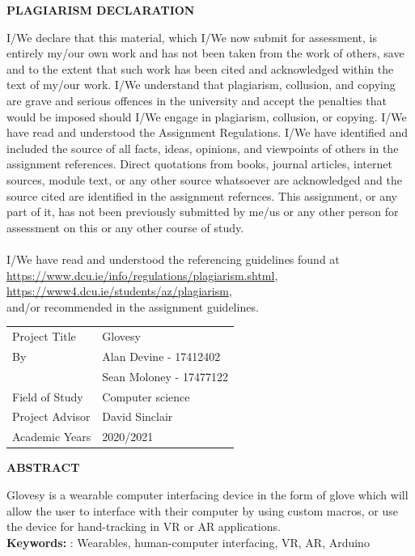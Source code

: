 \documentclass[12pt,a4paper,oneside]{book}
\theoremstyle{plain}
\numberwithin{equation}{chapter}
\begin{document}
\newpage
{}
\begin{center}
    \large\textbf{PLAGIARISM DECLARATION}
\end{center}
\noindent I/We declare that this material, which I/We now submit for assessment, is entirely my/our own work and has not been taken from the work of others, save and to the extent that such work has been cited and acknowledged within the text of my/our work. I/We understand that plagiarism, collusion, and copying are grave and serious offences in the university and accept the penalties that would be imposed should I/We engage in plagiarism, collusion, or copying. I/We have read and understood the Assignment Regulations. I/We have identified and included the source of all facts, ideas, opinions, and viewpoints of others in the assignment references. Direct quotations from books, journal articles, internet sources, module text, or any other source whatsoever are acknowledged and the source cited are identified in the assignment refernces. This assignment, or any part of it, has not been previously submitted by me/us or any other person for assessment on this or any other course of study. \\
\\
I/We have read and understood the referencing guidelines found at \\
\url{https://www.dcu.ie/info/regulations/plagiarism.shtml}, \\
\url{https://www4.dcu.ie/students/az/plagiarism}, \\
and/or recommended in the assignment guidelines.

\begin{table}[h]
	\begin{tabular}{ll}
		Project Title								   & Glovesy  \\
		By							   					  & Alan Devine - 17412402\\
															& Sean Moloney - 17477122\\
		Field of Study			  					 & Computer science \\
		Project Advisor								& David Sinclair \\
		Academic Years							  & 2020/2021 \\
	\end{tabular}
\end{table}

\newpage

\begin{center}
  \large\textbf{ABSTRACT}\\
\end{center}
\noindent Glovesy is a wearable computer interfacing device in the form of glove which will allow the user to interface with their computer by using custom macros, or use the device for hand-tracking in VR or AR applications. \\
\noindent \textbf{Keywords:} : Wearables, human-computer interfacing, VR, AR, Arduino
\end{document}
